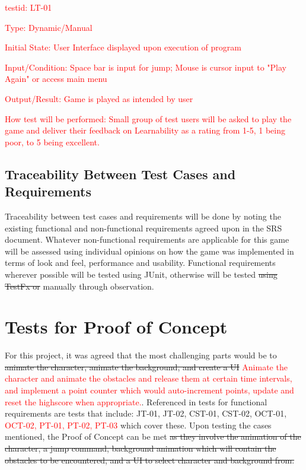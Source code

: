 \documentclass[12pt, titlepage]{article}
\begin{document}
\begin{enumerate}
\textcolor{red}{\item{testid: LT-01\\}}

\textcolor{red}{Type: Dynamic/Manual}
					
\textcolor{red}{Initial State: User Interface displayed upon execution of program}
					
\textcolor{red}{Input/Condition: Space bar is input for jump; Mouse is cursor input to "Play Again" or access main menu}
					
\textcolor{red}{Output/Result: Game is played as intended by user}
					
\textcolor{red}{How test will be performed: Small group of test users will be asked to play the game and deliver their feedback on Learnability as a rating from 1-5, 1 being poor, to 5 being excellent.}


\end{enumerate}

\subsection{Traceability Between Test Cases and Requirements}
Traceability between test cases and requirements will be done by noting the existing functional and non-functional requirements agreed upon in the SRS document. Whatever non-functional requirements are applicable for this game will be assessed using individual opinions on how the game was implemented in terms of look and feel, performance and usability. Functional requirements wherever possible will be tested using JUnit, otherwise will be tested \sout{using TestFx or} manually through observation.

\section{Tests for Proof of Concept}
For this project, it was agreed that the most challenging parts would be to \sout{animate the character, animate the background, and create a UI} \textcolor{red}{Animate the character and animate the obstacles and release them at certain time intervals, and implement a point counter which would auto-increment points, update and reset the highscore when appropriate.}. Referenced in tests for functional requirements are tests that include: JT-01, JT-02, CST-01, CST-02, OCT-01, \textcolor{red}{OCT-02, PT-01, PT-02, PT-03} which cover these. Upon testing the cases mentioned, the Proof of Concept can be met \sout{as they involve the animation of the character, a jump command, background animation which will contain the obstacles to be encountered, and a UI to select character and background from.} 
\end{document}
